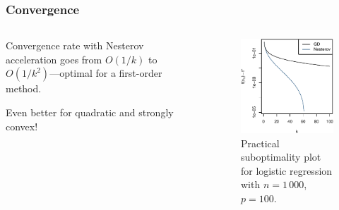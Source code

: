 \documentclass[aspectratio=1610,onlytextwidth]{beamer}
\begin{document}
\begin{frame}[c]
  \frametitle{Convergence}
  \begin{columns}
    \begin{column}{0.45\textwidth}
      Convergence rate with Nesterov acceleration goes from $O(1/k)$ to $O(1/k^2)$---optimal
      for a first-order method.

      \bigskip\pause

      Even better for quadratic and strongly convex!

    \end{column}
    \begin{column}{0.45\textwidth}
      \begin{figure}[htpb]
        \centering
        \includegraphics[]{images/momentum-convergence.pdf}
        \caption{%
          Practical suboptimality plot for logistic regression with
          $n = 1\,000$, $p = 100$.
        }
      \end{figure}
    \end{column}
  \end{columns}

\end{frame}
\end{document}
